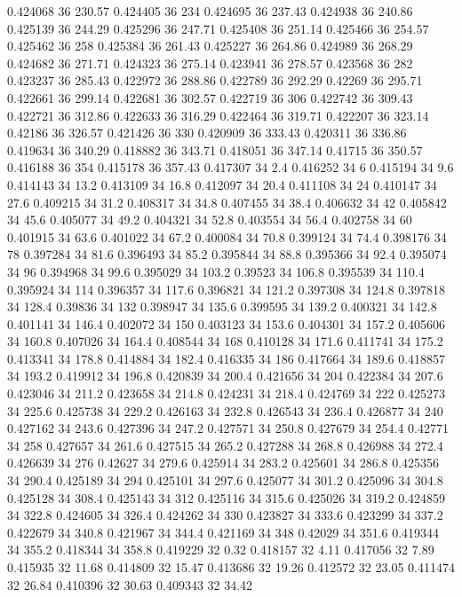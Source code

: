 0.424068 36 230.57
0.424405 36 234
0.424695 36 237.43
0.424938 36 240.86
0.425139 36 244.29
0.425296 36 247.71
0.425408 36 251.14
0.425466 36 254.57
0.425462 36 258
0.425384 36 261.43
0.425227 36 264.86
0.424989 36 268.29
0.424682 36 271.71
0.424323 36 275.14
0.423941 36 278.57
0.423568 36 282
0.423237 36 285.43
0.422972 36 288.86
0.422789 36 292.29
0.42269 36 295.71
0.422661 36 299.14
0.422681 36 302.57
0.422719 36 306
0.422742 36 309.43
0.422721 36 312.86
0.422633 36 316.29
0.422464 36 319.71
0.422207 36 323.14
0.42186 36 326.57
0.421426 36 330
0.420909 36 333.43
0.420311 36 336.86
0.419634 36 340.29
0.418882 36 343.71
0.418051 36 347.14
0.41715 36 350.57
0.416188 36 354
0.415178 36 357.43
0.417307 34 2.4
0.416252 34 6
0.415194 34 9.6
0.414143 34 13.2
0.413109 34 16.8
0.412097 34 20.4
0.411108 34 24
0.410147 34 27.6
0.409215 34 31.2
0.408317 34 34.8
0.407455 34 38.4
0.406632 34 42
0.405842 34 45.6
0.405077 34 49.2
0.404321 34 52.8
0.403554 34 56.4
0.402758 34 60
0.401915 34 63.6
0.401022 34 67.2
0.400084 34 70.8
0.399124 34 74.4
0.398176 34 78
0.397284 34 81.6
0.396493 34 85.2
0.395844 34 88.8
0.395366 34 92.4
0.395074 34 96
0.394968 34 99.6
0.395029 34 103.2
0.39523 34 106.8
0.395539 34 110.4
0.395924 34 114
0.396357 34 117.6
0.396821 34 121.2
0.397308 34 124.8
0.397818 34 128.4
0.39836 34 132
0.398947 34 135.6
0.399595 34 139.2
0.400321 34 142.8
0.401141 34 146.4
0.402072 34 150
0.403123 34 153.6
0.404301 34 157.2
0.405606 34 160.8
0.407026 34 164.4
0.408544 34 168
0.410128 34 171.6
0.411741 34 175.2
0.413341 34 178.8
0.414884 34 182.4
0.416335 34 186
0.417664 34 189.6
0.418857 34 193.2
0.419912 34 196.8
0.420839 34 200.4
0.421656 34 204
0.422384 34 207.6
0.423046 34 211.2
0.423658 34 214.8
0.424231 34 218.4
0.424769 34 222
0.425273 34 225.6
0.425738 34 229.2
0.426163 34 232.8
0.426543 34 236.4
0.426877 34 240
0.427162 34 243.6
0.427396 34 247.2
0.427571 34 250.8
0.427679 34 254.4
0.42771 34 258
0.427657 34 261.6
0.427515 34 265.2
0.427288 34 268.8
0.426988 34 272.4
0.426639 34 276
0.42627 34 279.6
0.425914 34 283.2
0.425601 34 286.8
0.425356 34 290.4
0.425189 34 294
0.425101 34 297.6
0.425077 34 301.2
0.425096 34 304.8
0.425128 34 308.4
0.425143 34 312
0.425116 34 315.6
0.425026 34 319.2
0.424859 34 322.8
0.424605 34 326.4
0.424262 34 330
0.423827 34 333.6
0.423299 34 337.2
0.422679 34 340.8
0.421967 34 344.4
0.421169 34 348
0.42029 34 351.6
0.419344 34 355.2
0.418344 34 358.8
0.419229 32 0.32
0.418157 32 4.11
0.417056 32 7.89
0.415935 32 11.68
0.414809 32 15.47
0.413686 32 19.26
0.412572 32 23.05
0.411474 32 26.84
0.410396 32 30.63
0.409343 32 34.42
